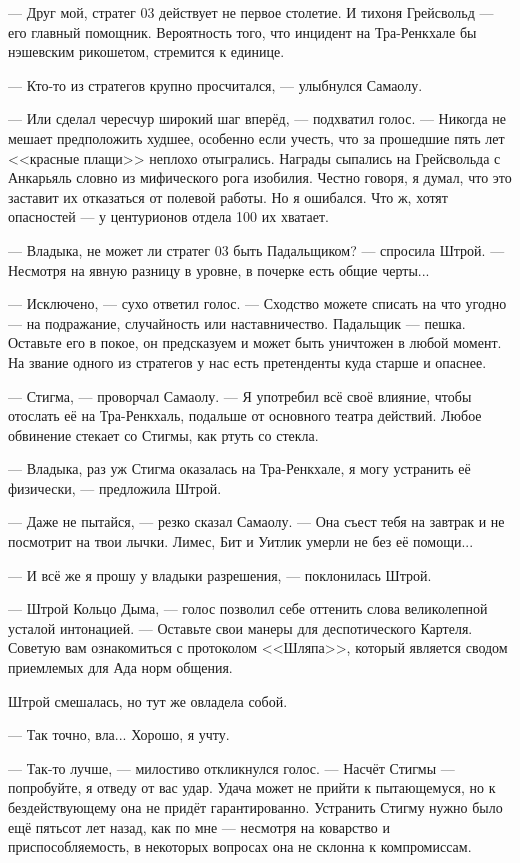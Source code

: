--- Друг мой, стратег 03 действует не первое столетие.
И тихоня Грейсвольд --- его главный помощник.
Вероятность того, что инцидент на Тра-Ренкхале бы нэшевским рикошетом, стремится к единице.

--- Кто-то из стратегов крупно просчитался, --- улыбнулся Самаолу.

--- Или сделал чересчур широкий шаг вперёд, --- подхватил голос.
--- Никогда не мешает предположить худшее, особенно если учесть, что за прошедшие пять лет <<красные плащи>> неплохо отыгрались.
Награды сыпались на Грейсвольда с Анкарьяль словно из мифического рога изобилия.
Честно говоря, я думал, что это заставит их отказаться от полевой работы.
Но я ошибался.
Что ж, хотят опасностей --- у центурионов отдела 100 их хватает.

--- Владыка, не может ли стратег 03 быть Падальщиком? --- спросила Штрой.
--- Несмотря на явную разницу в уровне, в почерке есть общие черты...

--- Исключено, --- сухо ответил голос.
--- Сходство можете списать на что угодно --- на подражание, случайность или наставничество.
Падальщик --- пешка.
Оставьте его в покое, он предсказуем и может быть уничтожен в любой момент.
На звание одного из стратегов у нас есть претенденты куда старше и опаснее.

--- Стигма, --- проворчал Самаолу.
--- Я употребил всё своё влияние, чтобы отослать её на Тра-Ренкхаль, подальше от основного театра действий.
Любое обвинение стекает со Стигмы, как ртуть со стекла.

--- Владыка, раз уж Стигма оказалась на Тра-Ренкхале, я могу устранить её физически, --- предложила Штрой.

--- Даже не пытайся, --- резко сказал Самаолу.
--- Она съест тебя на завтрак и не посмотрит на твои лычки.
Лимес, Бит и Уитлик умерли не без её помощи...

--- И всё же я прошу у владыки разрешения, --- поклонилась Штрой.

--- Штрой Кольцо Дыма, --- голос позволил себе оттенить слова великолепной усталой интонацией.
--- Оставьте свои манеры для деспотического Картеля.
Советую вам ознакомиться с протоколом <<Шляпа>>, который является сводом приемлемых для Ада норм общения.

Штрой смешалась, но тут же овладела собой.

--- Так точно, вла...
Хорошо, я учту.

--- Так-то лучше, --- милостиво откликнулся голос.
--- Насчёт Стигмы --- попробуйте, я отведу от вас удар.
Удача может не прийти к пытающемуся, но к бездействующему она не придёт гарантированно.
Устранить Стигму нужно было ещё пятьсот лет назад, как по мне --- несмотря на коварство и приспособляемость, в некоторых вопросах она не склонна к компромиссам.

